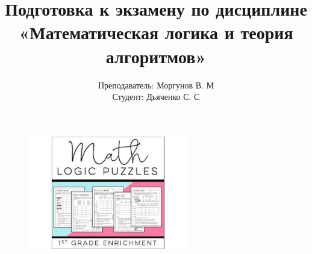 \documentclass[20pt]{article}
\title{
    \textbf{Подготовка к экзамену по дисциплине «Математическая логика и теория алгоритмов»
    }
}
\author{Преподаватель: Моргунов В. М\\
        Студент: Дьяченко С. С\\
}
\begin{document}
    \maketitle
	\begin{figure}[th]
		\centering
		\includegraphics[width=7cm]{overleaf-logo}
		\label{fig:img1}
	\end{figure}

\end{document}
